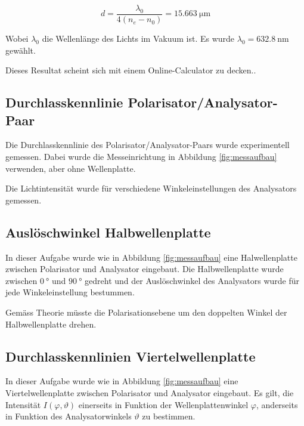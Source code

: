 \begin{equation}
    d = \frac{\lambda_0}{4\left(n_e-n_0\right)} = \SI{15.663}{\micro\meter}
\end{equation}

Wobei  $\lambda_0$  die  Wellenl\"ange  des  Lichts  im  Vakuum  ist.  Es  wurde
$\lambda_0=\SI{632.8}{\nano\meter}$ gew\"ahlt.

Dieses    Resultat    scheint    sich    mit    einem    Online-Calculator    zu
decken.\cite{ref:waveplate_calculator}.


\subsection{Durchlasskennlinie Polarisator/Analysator-Paar}

Die  Durchlasskennlinie  des  Polarisator/Analysator-Paars  wurde  experimentell
gemessen. Dabei wurde  die  Messeinrichtung  in  Abbildung  \ref{fig:messaufbau}
verwenden, aber ohne Wellenplatte.

Die  Lichtintensit\"at   wurde   f\"ur   verschiedene   Winkeleinstellungen  des
Analysators gemessen.


\subsection{Ausl\"oschwinkel Halbwellenplatte}

In  dieser   Aufgabe   wurde   wie   in   Abbildung   \ref{fig:messaufbau}  eine
Halwellenplatte    zwischen   Polarisator   und   Analysator   eingebaut.    Die
Halbwellenplatte wurde zwischen $\SI{0}{\degree}$ und $\SI{90}{\degree}$ gedreht
und der Ausl\"oschwinkel des  Analysators  wurde  f\"ur  jede  Winkeleinstellung
bestummen.

Gem\"ass  Theorie  m\"usste die Polarisationsebene um den doppelten  Winkel  der
Halbwellenplatte drehen.


\subsection{Durchlasskennlinien Viertelwellenplatte}

In   dieser   Aufgabe  wurde  wie   in   Abbildung   \ref{fig:messaufbau}   eine
Viertelwellenplatte zwischen Polarisator  und Analysator eingebaut. Es gilt, die
Intensit\"at    $I(\varphi,\vartheta)$     einerseits     in     Funktion    der
Wellenplattenwinkel  $\varphi$,  anderseits in  Funktion  des  Analysatorwinkels
$\vartheta$ zu bestimmen.

